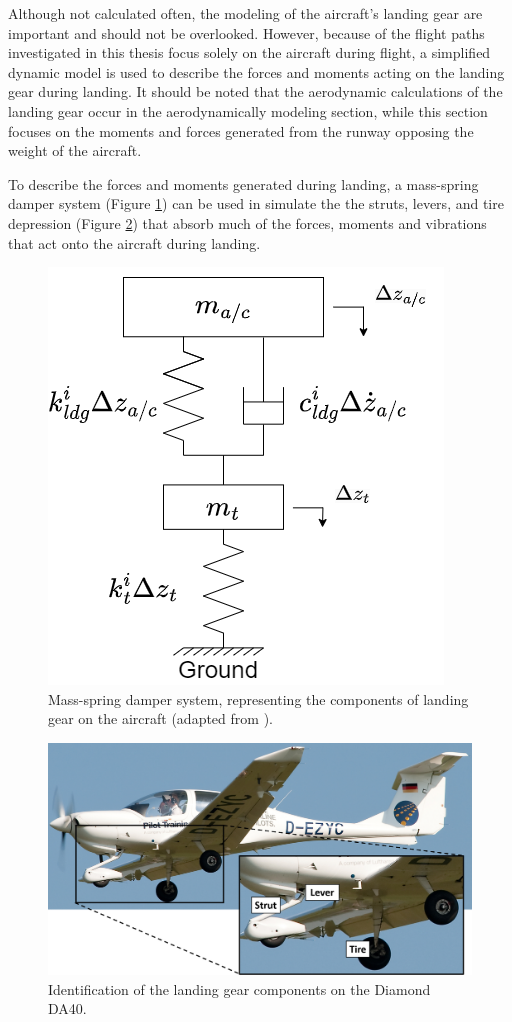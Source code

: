 \documentclass[../chapter_2.tex]{subfiles}
\begin{document}
Although not calculated often, the modeling of the aircraft's landing gear are important and should not be overlooked. However, because of the flight paths investigated in this thesis focus solely on the aircraft during flight, a simplified dynamic model is used to describe the forces and moments acting on the landing gear during landing. It should be noted that the aerodynamic calculations of the landing gear occur in the aerodynamically modeling section, while this section focuses on the moments and forces generated from the runway opposing the weight of the aircraft.

To describe the forces and moments generated during landing, a mass-spring damper system (Figure \ref{fig:ldgfbd}) can be used in simulate the the struts, levers, and tire depression (Figure \ref{fig:ldg}) that absorb much of the forces, moments and vibrations that act onto the aircraft during landing.

\begin{figure}[!ht]
        \centering
    \includegraphics[width=.4\linewidth]{../../Figures/ldgfbd.drawio.png}
    \caption{Mass-spring damper system, representing the components of landing gear on the aircraft (adapted from \cite{xingStrengthAnalysisDiagonal2012}).}
    \label{fig:ldgfbd}
\end{figure}

\begin{figure}[!ht]
        \centering
    \includegraphics[width=.75\linewidth]{../../Figures/LandingGear.png}
    \caption{Identification of the landing gear components on the Diamond DA40.}
    \label{fig:ldg}
\end{figure}
\end{document}
